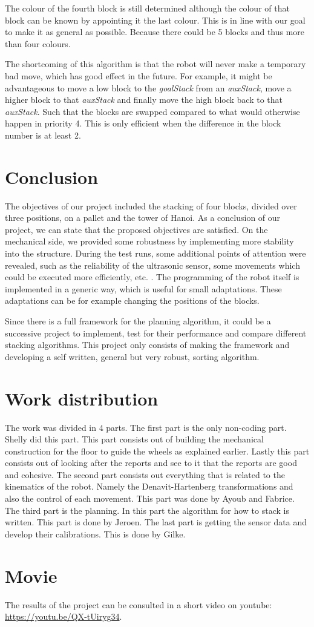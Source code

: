 \documentclass{article}
\begin{document}
	\par The colour of the fourth block is still determined although the colour of that block can be known by appointing it the last colour. This is in line with our goal to make it as general as possible. Because there could be 5 blocks and thus more than four colours.
	
	\par The shortcoming of this algorithm is that the robot will never make a temporary bad move, which has good effect in the future. For example, it might be advantageous to move a low block to the \textit{goalStack} from an \textit{auxStack}, move a higher block to that \textit{auxStack} and finally move the high block back to that \textit{auxStack}. Such that the blocks are swapped compared to what would otherwise happen in priority 4. This is only efficient when the difference in the block number is at least 2. 
	
	
	\section{Conclusion}
	\par The objectives of our project included the stacking of four blocks, divided over three positions, on a pallet and the tower of Hanoi. 
	As a conclusion of our project, we can state that the proposed objectives are satisfied. 
	On the mechanical side, we provided some robustness by implementing more stability into the structure. During the test runs, some additional points of attention were revealed, such as the reliability of the ultrasonic sensor, some movements which could be executed more efficiently, etc. .
	The programming of the robot itself is implemented in a generic way, which is useful for small adaptations. These 
	adaptations can be for example changing the positions of the blocks.
	
	\par Since there is a full framework for the planning algorithm, it could be a successive project to implement, test for their performance and compare different stacking algorithms. This project only consists of making the framework and developing a self written, general but very robust, sorting algorithm.
	
	\section{Work distribution}
	The work was divided in 4 parts. 
	The first part is the only non-coding part. Shelly did this part. This part consists out of building the mechanical construction for the floor to guide the wheels as explained earlier. Lastly this part consists out of looking after the reports and see to it that the reports are good and cohesive.
	The second part consists out everything that is related to the kinematics of the robot. Namely the Denavit-Hartenberg transformations and also the control of each movement. This part was done by Ayoub and Fabrice. 
	The third part is the planning. In this part the algorithm for how to stack is written. This part is done by Jeroen.
	The last part is getting the sensor data and develop their calibrations. This is done by Gilke.
	
	\section{Movie}
	The results of the project can be consulted in a short video on youtube: \url{https://youtu.be/QX-tUiryg34}.
	
	
\end{document}
